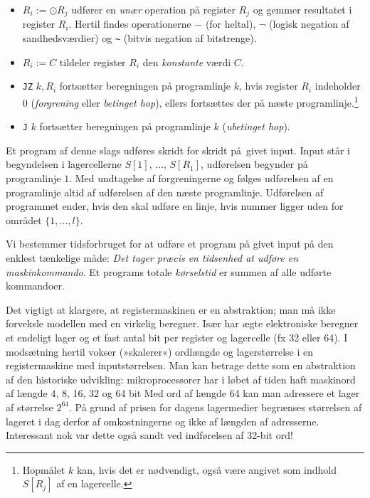 \begin{itemize}
  \item $R_i:=\odot R_j$ udfører en \emph{unær} operation
    på register $R_j$ og gemmer resultatet i register $R_i$.
    Hertil findes operationerne $-$ (for heltal), $\neg$ (logisk negation af sandhedsværdier) og \texttt{\~} (bitvis negation af bitstrenge).
  \item $R_i:= C$ tildeler register $R_i$ den \emph{konstante}
    værdi $C$.
  \item  \texttt{JZ} $k, R_i$ fortsætter beregningen på programlinje $k$, hvis register $R_i$ indeholder $0$ (\emph{forgrening}
    eller \emph{betinget hop}),
    ellers fortsættes der på næste programlinje.\footnote{%
      Hopmålet $k$ kan, hvis det er nødvendigt, også være angivet som indhold $S[R_j]$ af en lagercelle.}
    \item \texttt{J} $k$ fortsætter beregningen på programlinje $k$ (\emph{ubetinget hop}).
\end{itemize}

Et program af denne slags udføres skridt for skridt på givet input.
Input står i begyndelsen i lagercellerne $S[1]$, $\ldots$, $S[R_1]$, udførelsen begynder på programlinje $1$.
Med undtagelse af forgreningerne  og  følges udførelsen af en programlinje altid af udførelsen af den næste programlinje.
Udførelsen af programmet ender, hvis den skal udføre en linje, hvis nummer ligger uden for området $\{1,\ldots,l\}$.

Vi bestemmer tidsforbruget for at udføre et program på givet input på den enklest tænkelige måde:
\emph{Det tager præcis en tidsenhed at udføre en maskinkommando}.
Et programs totale \emph{kørselstid} 
er summen af alle udførte kommandoer.

Det vigtigt at klargøre, at registermaskinen er en abstraktion; man må ikke forveksle modellen med en virkelig beregner.
Især har ægte elektroniske beregner
et endeligt lager og et fast antal bit per register og lagercelle (fx 32 eller 64).
I modsætning hertil vokser (»skalerer«) ordlængde og lagerstørrelse i en registermaskine med inputstørrelsen.
Man kan betrage dette som en abstraktion af den historiske udvikling: 
mikroprocessorer har i løbet af tiden haft maskinord af længde 4, 8, 16, 32 og 64 bit
Med ord af længde 64 kan man adressere et lager af størrelse $2^{64}$.
På grund af prisen for dagens lagermedier begrænses størrelsen af lageret i dag derfor af omkostningerne og ikke af længden af adresserne.
Interessant nok var dette også sandt ved indførelsen af 32-bit ord!

